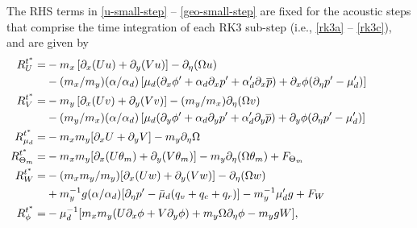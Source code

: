 %
\noindent
The RHS terms in \eqref{u-small-step} -- \eqref{geo-small-step} are
fixed for the acoustic steps that comprise the time integration of each
RK3 sub-step (i.e., \eqref{rk3a} -- \eqref{rk3c}),
and are given by
%
\begin{align}
R_U^{t^*} = & - m_x\left[\partial_x (Uu) + \partial_y (Vu)\right] - \partial_\eta (\Omega u)  & \cr
& -(m_x/m_y) (\alpha/\alpha_d) \left[ \mu_d (\partial_x \phi' + \alpha_d \partial_x p' + \alpha'_d \partial_x \overline{p}) +
\partial_x \phi (\partial_\eta p' - \mu'_d)\right]
\label{u-rhs}
\\
%
R_V^{t^*} = & - m_y\left[\partial_x (Uv) + \partial_y (Vv)\right] - (m_y/m_x) \partial_\eta (\Omega v)  & \cr
& -(m_y/m_x) (\alpha/\alpha_d) \left[ \mu_d (\partial_y \phi' + \alpha_d \partial_y p' + \alpha'_d \partial_y \overline{p}) +
\partial_y \phi (\partial_\eta p' - \mu'_d)\right]
\label{v-rhs}
\\ 
%
R_{\mu_d}^{t^*} = &
- m_x m_y[\partial_x U + \partial_y V] - m_y \partial_\eta \Omega
\label{mu-rhs}
\\
R_{\Theta_m}^{t^*} = &
- m_x m_y [\partial_x (U\theta_m) + \partial_y (V\theta_m)] - m_y \partial_\eta
(\Omega \theta_m) + F_{\Theta_m}
\label{theta-rhs}
\\
%
R_W^{t^*} = &
- (m_x m_y/m_y) [\partial_x (Uw) + \partial_y (Vw)] - \partial_\eta
(\Omega w)  ~~~~~~~~ ~~~~~~~~ ~~~~~~~~ ~~~~~~~~ ~~~ \notag 
\\
& + m_y^{-1} g (\alpha/\alpha_d) [\partial_\eta p' 
  - {\bar{\mu}}_d (q_v + q_c +q_r)]
  - m_y^{-1} {\mu}_d'g + F_W
\label{w-rhs} 
\\
%
R_\phi^{t^*} = &
- \mu_d^{-1}
[m_x m_y (U\partial_x\phi + V\partial_y\phi) + m_y
\Omega\partial_\eta\phi - m_y gW ],
\label{geo-rhs}
%
\end{align}
